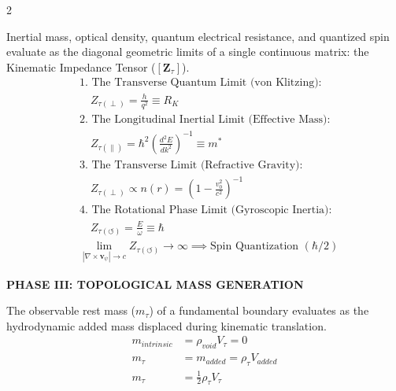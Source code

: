 \documentclass[11pt, a4paper]{article}
\newcounter{cheatnum}
\begin{document}
\begin{multicols}{2}
\begin{tcolorbox}[cheatbox, title={\refstepcounter{cheatnum}\label{box:universal_impedance}\thecheatnum. Universal Kinematic Vacuum Impedance  ($[\boldsymbol{Z}_{\tau}]$) \scriptsize\hfill\hyperref[sec:deriv_universal_impedance]{[Proof $\downarrow$]}}]
Inertial mass, optical density, quantum electrical resistance, and quantized spin evaluate as the diagonal geometric limits of a single continuous matrix: the Kinematic Impedance Tensor ($[\boldsymbol{Z}_{\tau}]$).
\begin{align}
    &\text{1. The Transverse Quantum Limit (von Klitzing):} \nonumber \\
    &\quad Z_{\tau(\perp)} = \frac{h}{q^2} \equiv R_K \label{eq:von_klitzing_impedance} \\
    &\text{2. The Longitudinal Inertial Limit (Effective Mass):} \nonumber \\
    &\quad Z_{\tau(\parallel)} = \hbar^2 \left( \frac{d^2 E}{dk^2} \right)^{-1} \equiv m^* \label{eq:effective_mass_impedance} \\
    &\text{3. The Transverse Limit (Refractive Gravity):} \nonumber \\
    &\quad Z_{\tau(\perp)} \propto n(r) = \left( 1 - \frac{v_0^2}{c^2} \right)^{-1} \label{eq:refractive_impedance} \\
    &\text{4. The Rotational Phase Limit (Gyroscopic Inertia):} \nonumber \\
    &\quad Z_{\tau(\circlearrowleft)} = \frac{E}{\omega} \equiv \hbar \label{eq:planck_impedance} \\
    &\lim_{|\nabla \times \mathbf{v}_{\psi}| \to c} Z_{\tau(\circlearrowleft)} \to \infty \implies \text{Spin Quantization } (\hbar/2) \label{eq:infinite_rotational_impedance}
\end{align}
\end{tcolorbox}

\newpage
\vspace{0.4cm}
\noindent\textbf{\large \color{academiabrown} PHASE III: TOPOLOGICAL MASS GENERATION}
\vspace{0.2cm}



\begin{tcolorbox}[cheatbox, title={\refstepcounter{cheatnum}\label{box:hydrodynamic_mass}\thecheatnum. The Kinematic Origin of Inertia \scriptsize\hfill\hyperref[sec:deriv_hydrodynamic_mass]{[Proof $\downarrow$]}}]
The observable rest mass ($m_\tau$) of a fundamental boundary evaluates as the hydrodynamic added mass displaced during kinematic translation. 
\begin{align}
    m_{intrinsic} &= \rho_{void} V_\tau = 0 \label{eq:intrinsic_mass} \\
    m_\tau &= m_{added} = \rho_{\tau} V_{added} \label{eq:kinematic_mass} \\
    m_\tau &= \frac{1}{2} \rho_{\tau} V_\tau \label{eq:mass_volume_equivalence}
\end{align}
\end{tcolorbox}


\end{multicols}
\end{document}
